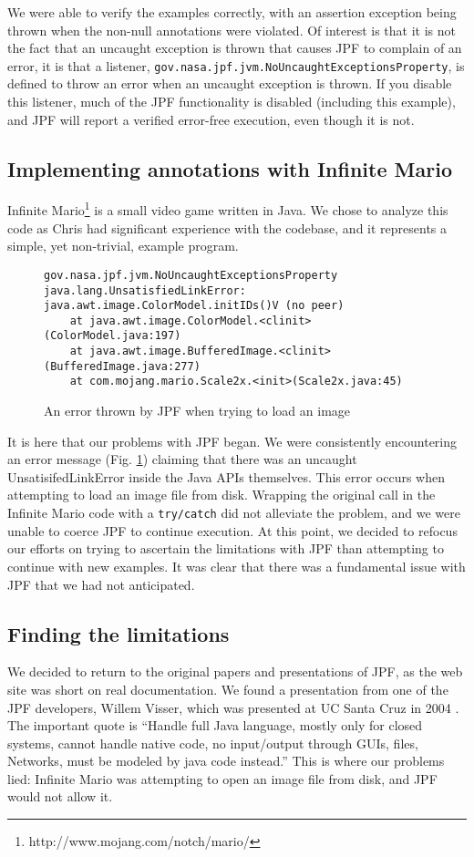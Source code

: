 \documentclass[twocolumn]{article}
\begin{document}
We were able to verify the examples correctly, with an assertion exception being thrown when the non-null annotations were violated. Of interest is that it is not the fact that an uncaught exception is thrown that causes JPF to complain of an error, it is that a listener, \texttt{gov.nasa.jpf.jvm.NoUncaughtExceptionsProperty}, is defined to throw an error when an uncaught exception is thrown. If you disable this listener, much of the JPF functionality is disabled (including this example), and JPF will report a verified error-free execution, even though it is not.

\subsection{Implementing annotations with Infinite Mario}
Infinite Mario\footnote{http://www.mojang.com/notch/mario/} is a small video game written in Java. We chose to analyze this code as Chris had significant experience with the codebase, and it represents a simple, yet non-trivial, example program.

\begin{figure}[tb]
    \lstset{language=,breaklines=true}
    \begin{lstlisting}
gov.nasa.jpf.jvm.NoUncaughtExceptionsProperty
java.lang.UnsatisfiedLinkError: java.awt.image.ColorModel.initIDs()V (no peer)
    at java.awt.image.ColorModel.<clinit>(ColorModel.java:197)
	at java.awt.image.BufferedImage.<clinit>(BufferedImage.java:277)
    at com.mojang.mario.Scale2x.<init>(Scale2x.java:45)
\end{lstlisting}
	\caption{An error thrown by JPF when trying to load an image}
	    \label{listing:error}
	\end{figure}

It is here that our problems with JPF began. We were consistently encountering an error message (Fig. \ref{listing:error}) claiming that there was an uncaught UnsatisifedLinkError inside the Java APIs themselves. This error occurs when attempting to load an image file from disk. Wrapping the original call in the Infinite Mario code with a \texttt{try/catch} did not alleviate the problem, and we were unable to coerce JPF to continue execution. At this point, we decided to refocus our efforts on trying to ascertain the limitations with JPF than attempting to continue with new examples. It was clear that there was a fundamental issue with JPF that we had not anticipated. 

\subsection{Finding the limitations}
We decided to return to the original papers and presentations of JPF, as the web site was short on real documentation. We found a presentation from one of the JPF developers, Willem Visser, which was presented at UC Santa Cruz in 2004 \cite{visser:presentation}. The important quote is ``Handle full Java language, mostly only for closed systems, cannot handle native code, no input/output through GUIs, files, Networks, must be modeled by java code instead.'' This is where our problems lied: Infinite Mario was attempting to open an image file from disk, and JPF would not allow it.
\end{document}
